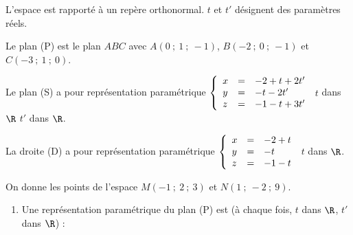 \begin{colonne*exercice}
\begin{exercice}
  \medskip
 
  L'espace est rapporté à un repère orthonormal. $t$ et $t'$ désignent
  des paramètres réels.

  Le plan (P) est le plan $ABC$ avec $A(0~;~1~;~-1)$, $B(-2~;~0~;~-1)$
  et $C(-3~;~1~;~0)$.

  Le plan (S) a pour représentation paramétrique
  $\left\{\begin{array}{l c l}
            x&=&- 2 + t + 2t'\\
            y&=&- t - 2t'\\
            z&=&- 1 - t + 3t'
          \end{array}\right.$  $t$ dans $\R$ $t'$ dans $\R$.

        La droite (D) a pour représentation paramétrique
        $\left\{\begin{array}{l c l}
                  x&=&- 2 + t\\
                  y&=&- t \\
                  z&=&- 1 - t
                \end{array}\right.$ $t$ dans $\R$.
 
              On donne les points de l'espace $M(-1~;~2~;~3)$ et
              $N(1~;~-2~;~9)$.

              \medskip
 
              \begin{enumerate}
              \item Une représentation paramétrique du plan (P) est (à
                chaque fois, $t$ dans $\R$, $t'$ dans $\R$) :


\end{enumerate}
\end{exercice}
\end{colonne*exercice}
